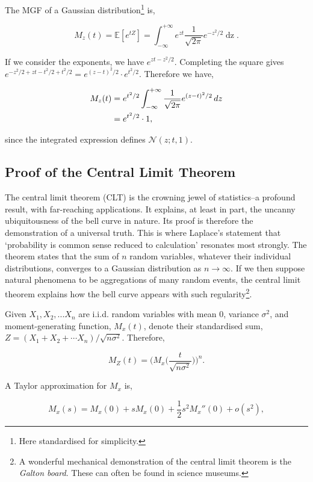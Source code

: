\documentclass[11pt]{amsart}
\begin{document}
The MGF of a Gaussian distribution\footnote{Here standardised for simplicity.} is,

$$M_z(t) = \mathbb{E}[e^{tZ}] = \int_{-\infty}^{+\infty}e^{zt}\frac{1}{\sqrt{2\pi}}e^{-z^2/2}\mathop{dz}.$$

If we consider the exponents, we have $e^{zt - z^2/2}$. Completing the square gives $e^{-z^2/2 + zt - t^2/2 + t^2/2} = e^{(z-t)^2/2}\cdot e^{t^2/2}$. Therefore we have,

\begin{align}
M_z(t) &= e^{t^2/2}\int_{-\infty}^{+\infty}\frac{1}{\sqrt{2\pi}}e^{(z-t)^2/2}\mathop{dz} \notag \\
&= e^{t^2/2} \cdot 1, \notag
\end{align}

since the integrated expression defines $\mathcal{N}(z ; t, 1)$. 

\subsection{Proof of the Central Limit Theorem}

The central limit theorem (CLT) is the crowning jewel of statistics--a profound result, with far-reaching applications. It explains, at least in part, the uncanny ubiquitousness of the bell curve in nature. Its proof is therefore the demonstration of a universal truth. This is where Laplace's statement that `probability is common sense reduced to calculation' resonates most strongly. The theorem states that the sum of $n$ random variables, whatever their individual distributions, converges to a Gaussian distribution as $n \to \infty$. If we then suppose natural phenomena to be aggregations of many random events, the central limit theorem explains how the bell curve appears with such regularity\footnote{A wonderful mechanical demonstration of the central limit theorem is the \emph{Galton board}. These can often be found in science museums.}.

Given $X_1, X_2, ... X_n$ are i.i.d. random variables with mean 0, variance $\sigma^2$, and moment-generating function, $M_x(t)$, denote their standardised sum, $Z = (X_1 + X_2 + \cdots X_n)/\sqrt{n\sigma^2}$. Therefore,

$$M_Z(t) = \Bigg(M_x\Bigg(\frac{t}{\sqrt{n\sigma^2}}\Bigg)\Bigg)^n.$$

A Taylor approximation for $M_x$ is,

$$M_x(s) = M_x(0) + sM_x(0) + \frac{1}{2}s^2M_x''(0) + o(s^2),$$
\end{document}
